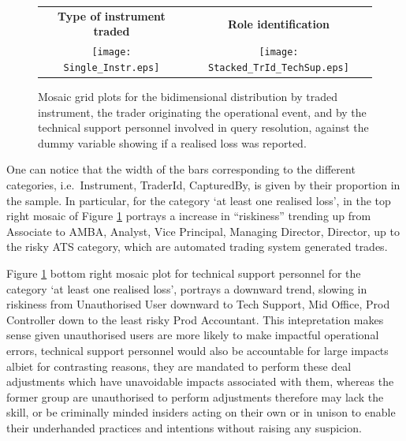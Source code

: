 \documentclass{DissertateUSU}
\begin{document}
\singlespacing

\doublespacing

\begin{figure}
\begin{frame}
      \centering
       \begin{tabular}{cc}
        \textbf{Type of instrument traded} & \textbf{Role identification} \\
        \texttt{[image: Single\_Instr.eps]}
         &
         \texttt{[image: Stacked\_TrId\_TechSup.eps]}
         \end{tabular}
    \end{frame}
    \caption{Mosaic grid plots for the bidimensional distribution by traded instrument, the trader originating the operational event, and by the technical support personnel involved in query resolution, against the dummy variable showing if a realised loss was reported.}
    \label{Mosaic_Instr_Trd_Tec}
\end{figure}

One can notice that the width of the bars corresponding to the different
categories, i.e.~Instrument, TraderId, CapturedBy, is given by their
proportion in the sample. In particular, for the category `at least one
realised loss', in the top right mosaic of Figure
\ref{Mosaic_Instr_Trd_Tec} portrays a increase in ``riskiness'' trending
up from Associate to AMBA, Analyst, Vice Principal, Managing Director,
Director, up to the risky ATS category, which are automated trading
system generated trades.\medskip

Figure \ref{Mosaic_Instr_Trd_Tec} bottom right mosaic plot for technical
support personnel for the category `at least one realised loss',
portrays a downward trend, slowing in riskiness from Unauthorised User
downward to Tech Support, Mid Office, Prod Controller down to the least
risky Prod Accountant. This intepretation makes sense given unauthorised
users are more likely to make impactful operational errors, technical
support personnel would also be accountable for large impacts albiet for
contrasting reasons, they are mandated to perform these deal adjustments
which have unavoidable impacts associated with them, whereas the former
group are unauthorised to perform adjustments therefore may lack the
skill, or be criminally minded insiders acting on their own or in unison
to enable their underhanded practices and intentions without raising any
suspicion.\medskip   
\end{document}
